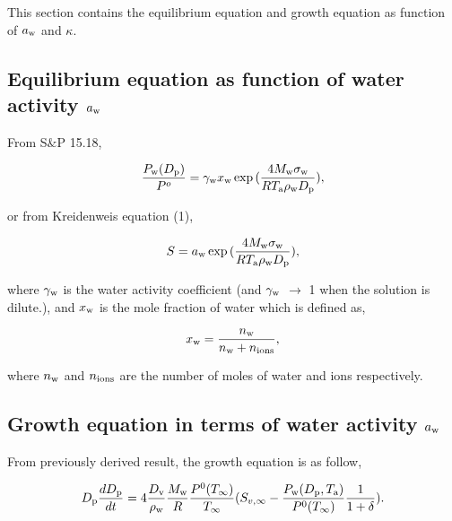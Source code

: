\documentclass[12pt]{article}
\begin{document}
This section contains the equilibrium equation and growth equation as function of $a_{\rm w}$ and $\kappa$. 

 
\subsection{Equilibrium equation as function of water activity $a_{\rm w}$}

From S$\&$P 15.18, 

\begin{equation}\label{eqn:8}
\frac{P_{\rm w}(D_{\rm p})}{P^{o}}=\gamma_{\rm w}x_{\rm w}\exp{(\frac{4 M_{\rm w} \sigma_{\rm w}}{R T_{\rm a} \rho_{\rm w} D_{\rm p}})},
\end{equation}

or from Kreidenweis equation (1),

\begin{equation}\label{eqn:9}
S=a_{\rm w}\exp{(\frac{4 M_{\rm w} \sigma_{\rm w}}{R T_{\rm a} \rho_{\rm w}D_{\rm p}})}, 
\end{equation}

where $\gamma_{\rm w}$ is the water activity coefficient (and $\gamma_{\rm w}$ $\rightarrow$ 1 when the solution is dilute.), and $x_{\rm w}$ is the mole fraction of water which is defined as,

\begin{equation}\label{eqn:10}
x_{\rm w}=\frac{n_{\rm w}}{n_{\rm w}+n_{\rm ions}},
\end{equation}

where $n_{\rm w}$ and $n_{\rm ions}$ are the number of moles of water and ions respectively.


\subsection{Growth equation in terms of water activity $a_{\rm w}$}

From previously derived result, the growth equation is as follow,

\begin{equation}\label{eqn:11}
D_{\rm p}\frac{dD_{\rm p}}{dt}=4 \frac{D_{\rm v}} {\rho_{\rm w}} \frac{M_{\rm w}}{R} \frac{P^{\rm 0}(T_{\infty})} {T_{\infty}} (S_{v, \infty} - \frac{P_{\rm w}(D_{\rm p}, T_{\rm a})}{P^{\rm 0}(T_{\infty})} \frac{1}{1+\delta}).
\end{equation}
\end{document}
